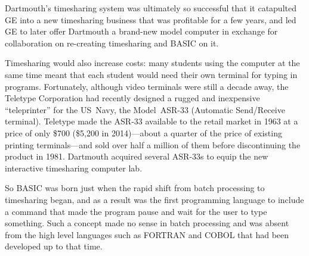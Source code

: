 \begin{tangent}
Dartmouth's timesharing system was ultimately so successful that it
catapulted GE into a new timesharing business that was profitable for a
few years, and led GE to later offer Dartmouth a brand-new model
computer in exchange for collaboration on re-creating timesharing and
BASIC on it.
\end{tangent}


Timesharing would also increase costs:
many students using the computer at the same time meant that each student
would need their own terminal for typing in programs.
Fortunately, although video terminals were still a decade away, 
the Teletype Corporation had recently designed a rugged and
inexpensive ``teleprinter'' for the US~Navy, the Model~ASR-33 (Automatic
Send/Receive terminal).  Teletype made the ASR-33
available to the retail market in 1963 at a price of only \$700 (\$5,200
in 2014)---about a quarter of the price of existing printing
terminals---and sold over
half a million of them before discontinuing the product in 1981.
Dartmouth acquired several ASR-33s to equip the new interactive
timesharing computer lab.



So BASIC was born just when the rapid shift from batch processing to
timesharing began, and as a result
was the first programming language to include a command that made
the program pause and wait for the user to type
something.  Such a concept made no sense in batch processing and was
absent from the high level languages such as FORTRAN and COBOL that had
been developed up to that time.
 
